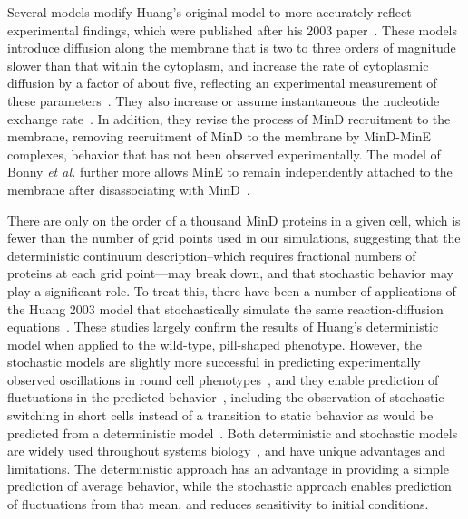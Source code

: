 \documentclass[10pt,letterpaper]{article}
\newcommand{\changed}[1]{{\color{red}#1}}
\begin{document}
Several models \cite{bonny2013membrane,
  halatek2012highly} modify Huang's original model to more accurately
reflect experimental findings, which were published after his 2003
paper~\cite{meacci2006mobility, loose2011min}. These models introduce
diffusion along the membrane that is two to three orders of magnitude
slower than that within the cytoplasm, and increase the rate of
cytoplasmic diffusion by a factor of about five, reflecting an
experimental measurement of these
parameters~\cite{meacci2006mobility}.  They also increase
or assume \changed{instantaneous the nucleotide exchange
rate~\cite{bonny2013membrane}}.  In addition, they revise the process
of MinD
recruitment to the membrane, removing recruitment of MinD to the
membrane by MinD-MinE complexes, behavior that has not been observed
experimentally.  The model of Bonny \emph{et al.} further more allows
MinE to remain independently attached to the membrane after
disassociating with MinD~\cite{bonny2013membrane}.
%

There are only on the order of a thousand MinD proteins in a given
cell, which is fewer than the number of grid points used in our
simulations, suggesting that the deterministic continuum
description--which requires fractional numbers of proteins at each
grid point---may break down, and that stochastic behavior may play a
significant role.  To treat this, there have been a number of
applications of the Huang 2003 model that stochastically simulate the
same reaction-diffusion equations~\cite{fange2006noise,
  kerr2006division}.  These studies largely confirm the results of
Huang's deterministic model when applied to the wild-type, pill-shaped
phenotype.  However, the stochastic models are slightly more
successful in predicting experimentally observed oscillations in round
cell phenotypes~\cite{fange2006noise, huang2004min}, and they enable
prediction of fluctuations in the predicted
behavior~\cite{kruse2007experimentalist}, including the observation of
stochastic switching in short cells instead of a transition to static
behavior as would be predicted from a deterministic
model~\cite{fischer2010intra}.  Both deterministic and
stochastic models are widely used throughout systems
biology~\cite{lawson2013spatial, robb2014stochastic,
  oguz2014stochastic, fu2013deterministic, rudiger2014stochastic}, and
have unique advantages and limitations.  The deterministic approach
has an advantage in providing a simple prediction of average behavior,
while the stochastic approach enables prediction of fluctuations from
that mean, and reduces sensitivity to initial conditions.
\end{document}
